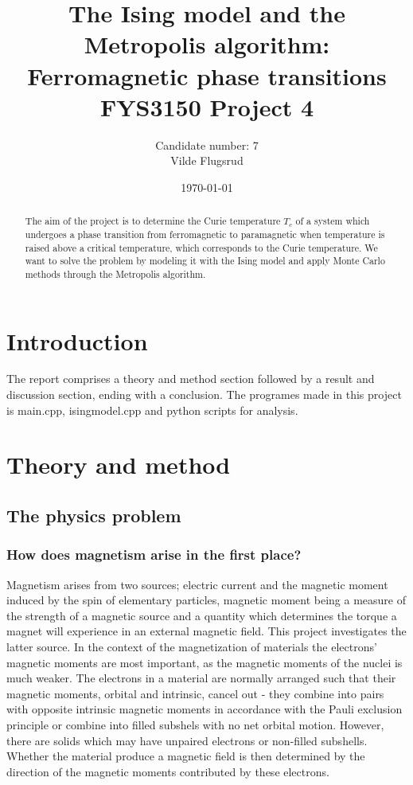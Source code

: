 \documentclass[norsk, 10pt, twocolumn, a4paper]{revtex4}
\begin{document}
\title{The Ising model and the Metropolis algorithm: \\ Ferromagnetic phase transitions \\ FYS3150 Project 4}
\author{Candidate number: 7 \\ Vilde Flugsrud}
\date{\today}

\begin{abstract}
    The aim of the project is to determine the Curie temperature $T_c$ of a system which undergoes a phase transition from ferromagnetic
    to paramagnetic when temperature is raised above a critical temperature, which corresponds to the Curie temperature. We want
    to solve the problem by modeling it with the Ising model and apply Monte Carlo methods through the Metropolis algorithm.

\end{abstract}

\maketitle

\section{Introduction}
    
    The report comprises a theory and method section followed by a result and discussion section, ending with a conclusion.
    The programes made in this project is main.cpp, isingmodel.cpp and python scripts for analysis.

\section{Theory and method}
\subsection{The physics problem}
\subsubsection{How does magnetism arise in the first place?}
Magnetism arises from two sources; electric current and the magnetic moment
induced by the spin of elementary particles, magnetic moment being a measure of the strength of a magnetic source and a
quantity which determines the torque a magnet will experience in an external magnetic field.
This project investigates the latter source. In the context of the magnetization of materials the electrons'
magnetic moments are most important, as the
magnetic moments of the nuclei is much weaker.
The electrons in a material are normally arranged such that their magnetic
moments, orbital and intrinsic, cancel out - they combine into pairs with
opposite intrinsic magnetic moments in accordance with the Pauli exclusion
principle or combine into filled subshels with no net orbital motion.
However, there are solids which may have unpaired electrons or non-filled
subshells. Whether the material produce a magnetic field is then determined
by the direction of the magnetic moments contributed by these electrons.
\end{document}

